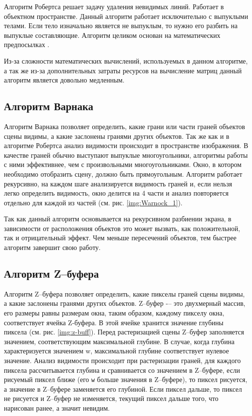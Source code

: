             Алгоритм Робертса решает задачу удаления невидимых линий. Работает в объектном пространстве. Данный алгоритм работает исключительно с выпуклыми телами. Если тело изначально является не выпуклым, то нужно его разбить на выпуклые составляющие. Алгоритм целиком основан на математических предпосылках \cite{rogers}.

            Из-за сложности математических вычислений, используемых в данном алгоритме, а так же из-за дополнительных затраты ресурсов на вычисление матриц данный алгоритм является довольно медленным.
        
        \subsection{Алгоритм Варнака}
        
            Алгоритм Варнака \cite{rogers,shykin,bayackovskiy} позволяет определить, какие грани или части граней объектов сцены видимы, а какие заслонены гранями других объектов. Так же как и в алгоритме Робертса анализ видимости происходит в пространстве изображения. В качестве граней обычно выступают выпуклые многоугольники, алгоритмы работы с ними эффективнее, чем с произвольными многоугольниками. Окно, в котором необходимо отобразить сцену, должно быть прямоугольным. Алгоритм работает рекурсивно, на каждом шаге анализируется видимость граней и, если нельзя легко определить видимость, окно делится на 4 части и анализ повторяется отдельно для каждой из частей (см. рис. \ref{img:Warnock_1}).
            
            
                Так как данный алгоритм основывается на рекурсивном разбиении экрана, в зависимости от расположения объектов это может вызвать, как положительной, так и отрицательный эффект. Чем меньше пересечений объектов, тем быстрее алгоритм завершит свою работу.
        
        \subsection{Алгоритм Z--буфера}
        
            Алгоритм Z--буфера \cite{rogers,shykin} позволяет определить, какие пикселы граней сцены видимы, а какие заслонены гранями других объектов. Z--буфер -– это двухмерный массив, его размеры равны размерам окна, таким образом, каждому пикселу окна, соответствует ячейка Z-буфера. В этой ячейке хранится значение глубины пиксела (см. рис. \ref{img:z-buff}). Перед растеризацией сцены Z--буфер заполняется значением, соответствующим максимальной глубине. В случае, когда глубина характеризуется значением w, максимальной глубине соответствует нулевое значение. Анализ видимости происходит при растеризации граней, для каждого пиксела рассчитывается глубина и сравнивается со значением в Z--буфере, если рисуемый пиксел ближе (его \texttt{w} больше значения в Z--буфере), то пиксел рисуется, а значение в Z--буфере заменяется его глубиной. Если пиксел дальше, то пиксел не рисуется и Z--буфер не изменяется, текущий пиксел дальше того, что нарисован ранее, а значит невидим. 
            
